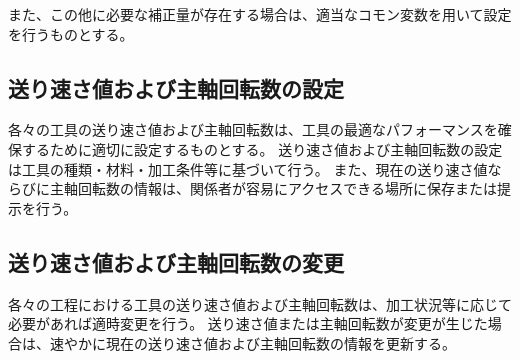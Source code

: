 また、この他に必要な補正量が存在する場合は、適当なコモン変数を用いて設定を行うものとする。




\subsection{送り速さ値および主軸回転数の設定}
各々の工具の送り速さ値および主軸回転数は、工具の最適なパフォーマンスを確保するために適切に設定するものとする。
送り速さ値および主軸回転数の設定は工具の種類・材料・加工条件等に基づいて行う。
また、現在の送り速さ値ならびに主軸回転数の情報は、関係者が容易にアクセスできる場所に保存または提示を行う。

\subsection{送り速さ値および主軸回転数の変更}
各々の工程における工具の送り速さ値および主軸回転数は、加工状況等に応じて必要があれば適時変更を行う。
送り速さ値または主軸回転数が変更が生じた場合は、速やかに現在の送り速さ値および主軸回転数の情報を更新する。
